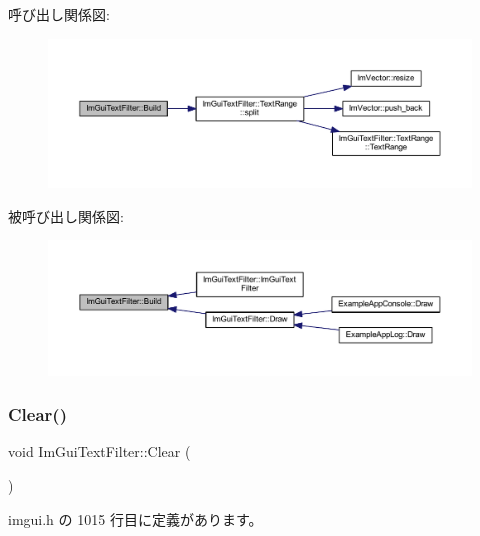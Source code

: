 呼び出し関係図\+:\nopagebreak
\begin{figure}[H]
\begin{center}
\leavevmode
\includegraphics[width=350pt]{struct_im_gui_text_filter_aef362baafaa9dfa62d11bc6101c0f4c1_cgraph}
\end{center}
\end{figure}
被呼び出し関係図\+:\nopagebreak
\begin{figure}[H]
\begin{center}
\leavevmode
\includegraphics[width=350pt]{struct_im_gui_text_filter_aef362baafaa9dfa62d11bc6101c0f4c1_icgraph}
\end{center}
\end{figure}
\mbox{\label{struct_im_gui_text_filter_a9043c1f0c33d29e6fc9b75ae81f9705a}} 
\subsubsection{\texorpdfstring{Clear()}{Clear()}}
{\footnotesize\ttfamily void Im\+Gui\+Text\+Filter\+::\+Clear (\begin{DoxyParamCaption}{ }\end{DoxyParamCaption})\hspace{0.3cm}{\ttfamily [inline]}}



 imgui.\+h の 1015 行目に定義があります。

\mbox{\label{struct_im_gui_text_filter_ab93ad5985019ff9d3781606551fc26cc}} 
